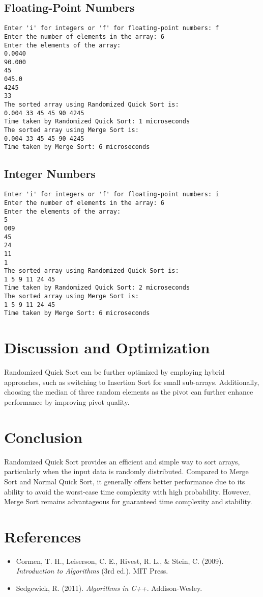 \documentclass{article}
\begin{document}
\subsection{Floating-Point Numbers}
\begin{verbatim}
Enter 'i' for integers or 'f' for floating-point numbers: f
Enter the number of elements in the array: 6
Enter the elements of the array:
0.0040
90.000
45
045.0
4245
33
The sorted array using Randomized Quick Sort is:
0.004 33 45 45 90 4245
Time taken by Randomized Quick Sort: 1 microseconds
The sorted array using Merge Sort is:
0.004 33 45 45 90 4245
Time taken by Merge Sort: 6 microseconds
\end{verbatim}

\subsection{Integer Numbers}
\begin{verbatim}
Enter 'i' for integers or 'f' for floating-point numbers: i
Enter the number of elements in the array: 6
Enter the elements of the array:
5
009
45
24
11
1
The sorted array using Randomized Quick Sort is:
1 5 9 11 24 45
Time taken by Randomized Quick Sort: 2 microseconds
The sorted array using Merge Sort is:
1 5 9 11 24 45
Time taken by Merge Sort: 6 microseconds
\end{verbatim}

\section{Discussion and Optimization}
Randomized Quick Sort can be further optimized by employing hybrid approaches, such as switching to Insertion Sort for small sub-arrays. Additionally, choosing the median of three random elements as the pivot can further enhance performance by improving pivot quality.

\section{Conclusion}
Randomized Quick Sort provides an efficient and simple way to sort arrays, particularly when the input data is randomly distributed. Compared to Merge Sort and Normal Quick Sort, it generally offers better performance due to its ability to avoid the worst-case time complexity with high probability. However, Merge Sort remains advantageous for guaranteed time complexity and stability.

\section*{References}
\begin{itemize}
    \item Cormen, T. H., Leiserson, C. E., Rivest, R. L., \& Stein, C. (2009). \textit{Introduction to Algorithms} (3rd ed.). MIT Press.
    \item Sedgewick, R. (2011). \textit{Algorithms in C++}. Addison-Wesley.
\end{itemize}
\end{document}
